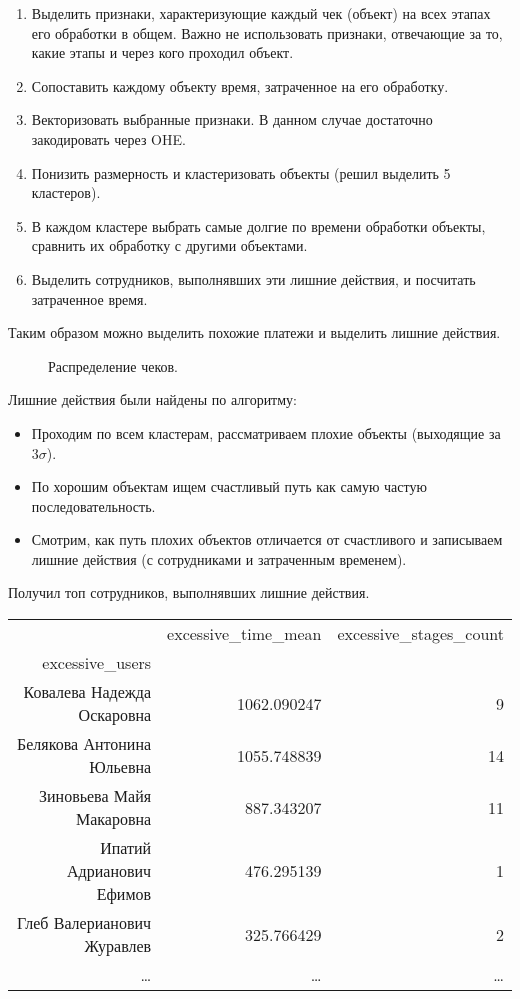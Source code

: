 \documentclass[12pt]{article}
\newcommand{\imgh}[3]
{
\begin{figure}[h]
\center{\texttt{[image: \#2]}}
\caption{#3}
\label{ris:#2}
\end{figure}
}
\begin{document}
\begin{enumerate}
    \item Выделить признаки, характеризующие каждый чек (объект) на всех этапах его обработки в общем. Важно не использовать признаки, отвечающие за то, какие этапы и через кого проходил объект.
    \item Сопоставить каждому объекту время, затраченное на его обработку.
    \item Векторизовать выбранные признаки. В данном случае достаточно закодировать через OHE.
    \item Понизить размерность и кластеризовать объекты (решил выделить 5 кластеров).
    \item В каждом кластере выбрать самые долгие по времени обработки объекты, сравнить их обработку с другими объектами.
    \item Выделить сотрудников, выполнявших эти лишние действия, и посчитать затраченное время.
\end{enumerate}

Таким образом можно выделить похожие платежи и выделить лишние действия. 

\imgh{15cm}{checks_proj.png}{Распределение чеков.}
\newpage

Лишние действия были найдены по алгоритму:
\begin{itemize}
    \item Проходим по всем кластерам, рассматриваем плохие объекты (выходящие за $3 \sigma$).

    \item По хорошим объектам ищем счастливый путь как самую частую последовательность.
    
    \item Смотрим, как путь плохих объектов отличается от счастливого и записываем лишние действия (с сотрудниками и затраченным временем).
\end{itemize}

Получил топ сотрудников, выполнявших лишние действия.

\begin{tabular}{rrr}
\hline
{} &  excessive\_time\_mean &  excessive\_stages\_count \\
excessive\_users            &                 &                   \\
\hline
Ковалева Надежда Оскаровна &     1062.090247 &                 9 \\
Белякова Антонина Юльевна  &     1055.748839 &                14 \\
Зиновьева Майя Макаровна   &      887.343207 &                11 \\
Ипатий Адрианович Ефимов   &      476.295139 &                 1 \\
Глеб Валерианович Журавлев &      325.766429 &                 2 \\
\dots & \dots & \dots \\
\hline
\end{tabular}
\newpage
\end{document}
